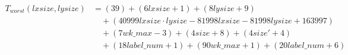 \begin{align}
\label{eq:analyse-arlabeling-all-1}
T_{worst}(\mathit{lxsize},\mathit{lysize})& =
 (39)
 + (6\mathit{lxsize} + 1)
 + (8\mathit{lysize} + 9)
\\
& \quad
 + (40999\mathit{lxsize} \cdot \mathit{lysize} - 81998\mathit{lxsize} - 81998\mathit{lysize} + 163997)
\nonumber \\
& \quad
 + (7\mathit{wk\_max} - 3)
 + (4\mathit{size} + 8)
 + (4\mathit{size}' + 4)
\nonumber \\
& \quad
 + (18\mathit{label\_num} + 1)
 + (90\mathit{wk\_max} + 1)
 + (20\mathit{label\_num} + 6)
\nonumber
\end{align}
